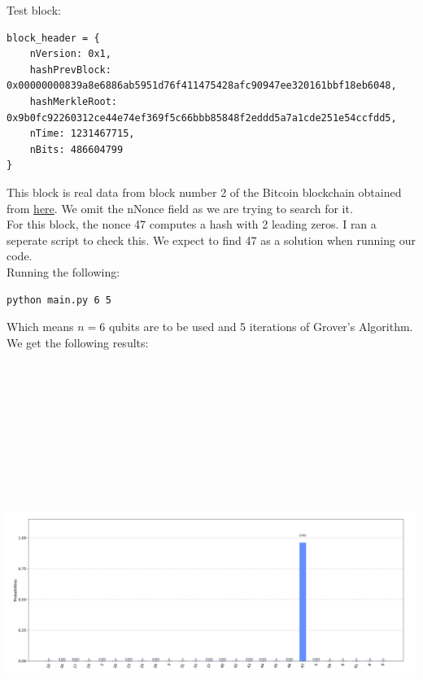 \documentclass[11pt]{article} %
\begin{document}
\noindent Test block:
\begin{verbatim}
block_header = {
    nVersion: 0x1,
    hashPrevBlock: 0x00000000839a8e6886ab5951d76f411475428afc90947ee320161bbf18eb6048,
    hashMerkleRoot: 0x9b0fc92260312ce44e74ef369f5c66bbb85848f2eddd5a7a1cde251e54ccfdd5,
    nTime: 1231467715,
    nBits: 486604799
}
\end{verbatim}

\noindent This block is real data from block number 2 of the Bitcoin blockchain obtained from \href{https://www.blockchain.com/btc/block/2}{here}. We omit the nNonce field as we are trying to search for it.\\

\noindent For this block, the nonce 47 computes a hash with 2 leading zeros. I ran a seperate script to check this. We expect to find 47 as a solution when running our code.\\

\noindent Running the following:

\begin{verbatim}
python main.py 6 5
\end{verbatim}

\noindent Which means $n = 6$ qubits are to be used and 5 iterations of Grover's Algorithm. We get the following results:

\includegraphics[keepaspectratio, width=15cm, height=15cm]{plot}
\end{document}
